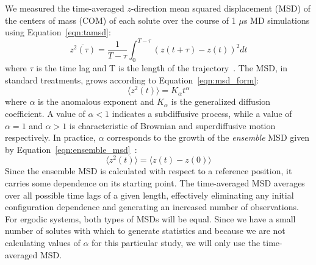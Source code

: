 \documentclass[journal=jpcbfk,manuscript=article]{achemso}
\begin{document}
  We measured the time-averaged $z$-direction mean squared displacement (MSD) of the
  centers of mass (COM) of each solute over the course of 1 $\mu$s MD simulations using 
  Equation~\ref{eqn:tamsd}:
  \begin{equation}
	\overline{z^2(\tau)} = \dfrac{1}{T - \tau}\int_{0}^{T - \tau} (z(t + \tau) - z(t))^2 dt
	\label{eqn:tamsd}
  \end{equation}
  where $\tau$ is the time lag and T is the length of the trajectory~\cite{meroz_toolbox_2015}. 
  The MSD, in standard treatments, grows according to Equation~\ref{eqn:msd_form}:
  \begin{equation} 
	\langle z^2(t) \rangle = K_{\alpha}t^\alpha
	\label{eqn:msd_form}
  \end{equation} 
  where $\alpha$ is the anomalous exponent and $K_\alpha$ is the generalized diffusion 
  coefficient. A value of $\alpha < 1$ indicates a subdiffusive process, while a value 
  of $\alpha = 1$ and $\alpha > 1$ is characteristic of Brownian and superdiffusive
  motion respectively.
  In practice, $\alpha$ corresponds to the growth of the \textit{ensemble} MSD given
  by Equation~\ref{eqn:ensemble_msd}~\cite{meroz_toolbox_2015}:
  \begin{equation}
	\langle z^2(t) \rangle = \langle z(t) - z(0) \rangle
	\label{eqn:ensemble_msd}
  \end{equation}
  Since the ensemble MSD is calculated with respect to a reference position, it carries
  some dependence on its starting point. The time-averaged MSD averages over all possible
  time lags of a given length, effectively eliminating any initial configuration 
  dependence and generating	an increased number of observations. For ergodic systems, 
  both types of MSDs will be equal. Since we have a small number of solutes with which to
  generate statistics and because we are not calculating values of $\alpha$ for this 
  particular study,	we will only use the time-averaged MSD.
  
\end{document}
